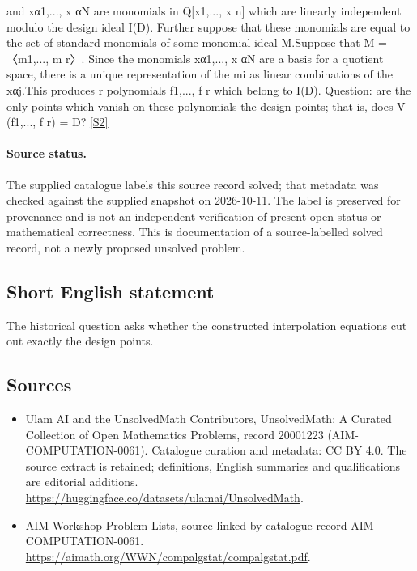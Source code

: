 \documentclass[11pt]{article}
\newcommand{\sref}[2]{\hyperlink{source:#1:#2}{[S#2]}}
\begin{document}
and xα1,..., x αN are monomials in Q[x1,..., x n] which are linearly independent modulo the design ideal I(D). Further suppose that these monomials are equal to the set of standard monomials of some monomial ideal M.Suppose that M = 〈m1,..., m r〉. Since the monomials xα1,..., x αN are a basis for a quotient space, there is a unique representation of the mi as linear combinations of the xαj.This produces r polynomials f1,..., f r which belong to I(D). Question: are the only points which vanish on these polynomials the design points; that is, does V (f1,..., f r) = D? \sref{20001223}{2}
\paragraph{Source status.}
The supplied catalogue labels this source record solved; that metadata was checked against the supplied snapshot on 2026-10-11. The label is preserved for provenance and is not an independent verification of present open status or mathematical correctness. This is documentation of a source-labelled solved record, not a newly proposed unsolved problem.
\subsection{Short English statement}
The historical question asks whether the constructed interpolation equations cut out exactly the design points.
\subsection{Sources}
\begin{itemize}
\item[\hypertarget{source:20001223:1}{S1}] Ulam AI and the UnsolvedMath Contributors, UnsolvedMath: A Curated Collection of Open Mathematics Problems, record 20001223 (AIM-COMPUTATION-0061). Catalogue curation and metadata: CC BY 4.0. The source extract is retained; definitions, English summaries and qualifications are editorial additions.
\url{https://huggingface.co/datasets/ulamai/UnsolvedMath}.
\item[\hypertarget{source:20001223:2}{S2}] AIM Workshop Problem Lists, source linked by catalogue record AIM-COMPUTATION-0061.
\url{https://aimath.org/WWN/compalgstat/compalgstat.pdf}.
\end{itemize}
\end{document}
